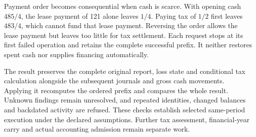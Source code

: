 Payment order becomes consequential when cash is scarce. With opening cash
$485/4$, the lease payment of 121 alone leaves $1/4$. Paying tax of $1/2$
first leaves $483/4$, which cannot fund that lease payment. Reversing the order
allows the lease payment but leaves too little for tax settlement. Each request
stops at its first failed operation and retains the complete successful prefix.
It neither restores spent cash nor supplies financing automatically.

The result preserves the complete original report, loss state and conditional
tax calculation alongside the subsequent journals and gross cash movements.
Applying it recomputes the ordered prefix and compares the whole result.
Unknown findings remain unresolved, and repeated identities, changed balances
and backdated activity are refused. These checks establish selected same-period
execution under the declared assumptions. Further tax assessment, financial-year
carry and actual accounting admission remain separate work.
